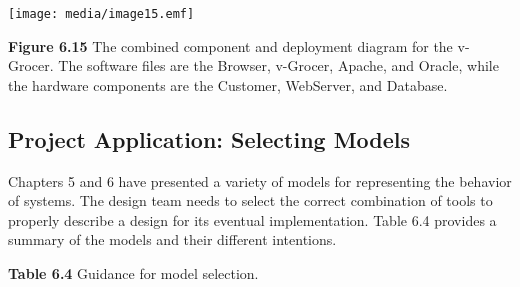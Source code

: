 \texttt{[image: media/image15.emf]}

\textbf{Figure 6.15} The combined component and deployment diagram for
the v-Grocer. The software files are the Browser, v-Grocer, Apache, and
Oracle, while the hardware components are the Customer, WebServer, and
Database.

\subsection{Project Application: Selecting
Models}\label{project-application-selecting-models}

Chapters 5 and 6 have presented a variety of models for representing the
behavior of systems. The design team needs to select the correct
combination of tools to properly describe a design for its eventual
implementation. Table 6.4 provides a summary of the models and their
different intentions.

\textbf{\hfill\break
Table 6.4} Guidance for model selection.

